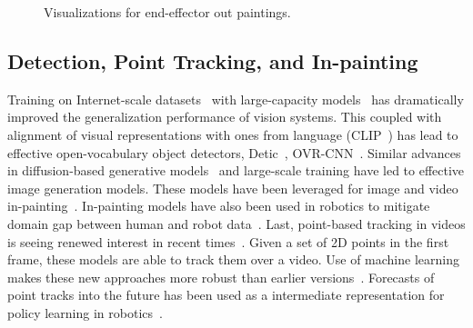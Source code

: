 \begin{figure}
\setlength{\tabcolsep}{2pt}
\caption{Visualizations for end-effector out paintings.}
\end{figure}

\subsection{Detection, Point Tracking, and In-painting}
Training on Internet-scale datasets~\cite{radford2021learning, achiam2023gpt,
kirillov2023segment} with large-capacity models~\cite{dosovitskiy2021image} has dramatically improved the generalization performance of
vision systems. This coupled with alignment of visual representations with ones
from language (\eg CLIP~\cite{radford2021learning}) has lead to
effective open-vocabulary object detectors, \eg Detic~\cite{zhou2022detecting},
OVR-CNN~\cite{zareian2021open}.
Similar advances in diffusion-based generative
models~\cite{sohl2015deep, rombach2021high, ho2020denoising, song2020score} and
large-scale training have led to effective image generation models. These models have been leveraged for image and video
in-painting~\cite{zhou2023propainter, chang2023look}. In-painting models have
also been used in robotics to mitigate domain gap between human and
robot data~\cite{bahl2022human, chang2023look}. 
Last, point-based tracking in videos is seeing renewed interest in recent
times~\cite{harley2022particle, karaev2023cotracker, doersch2023tapir,
zheng2023pointodyssey}. Given a set of 2D points in the first frame, these
models are able to track them over a video. Use of machine learning makes
these new approaches more robust than earlier versions~\cite{shi1994good}. Forecasts of point tracks into the future has been
used as a intermediate representation for policy learning in
robotics~\cite{wen2023any, bharadhwaj2024track2act}. 
